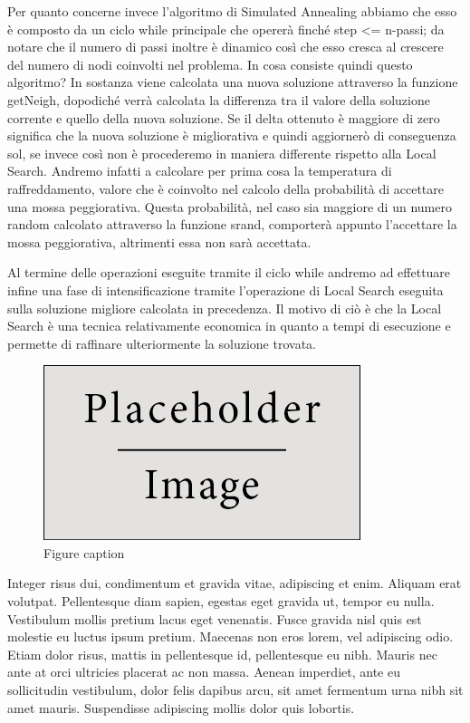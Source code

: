 \documentclass[preprint,12pt]{elsarticle}
\begin{document}
Per quanto concerne invece l'algoritmo di Simulated Annealing abbiamo che esso è composto da un ciclo while principale che opererà finché step <= n-passi; da notare che il numero di passi inoltre è dinamico così che esso cresca al crescere del numero di nodi coinvolti nel problema. In cosa consiste quindi questo algoritmo? In sostanza viene calcolata una nuova soluzione attraverso la funzione getNeigh, dopodiché verrà calcolata la differenza tra il valore della soluzione corrente e quello della nuova soluzione. Se il delta ottenuto è maggiore di zero significa che la nuova soluzione è migliorativa e quindi aggiornerò di conseguenza sol, se invece così non è procederemo in maniera differente rispetto alla Local Search. Andremo infatti a calcolare per prima cosa la temperatura di raffreddamento, valore che è coinvolto nel calcolo della probabilità di accettare una mossa peggiorativa. Questa probabilità, nel caso sia maggiore di un numero random calcolato attraverso la funzione srand, comporterà appunto l'accettare la mossa peggiorativa, altrimenti essa non sarà accettata.

Al termine delle operazioni eseguite tramite il ciclo while andremo ad effettuare infine una fase di intensificazione tramite l'operazione di Local Search eseguita sulla soluzione migliore calcolata in precedenza. Il motivo di ciò è che la Local Search è una tecnica relativamente economica in quanto a tempi di esecuzione e permette di raffinare ulteriormente la soluzione trovata.


\begin{figure}[h]
\centering\includegraphics[width=0.4\linewidth]{placeholder}
\caption{Figure caption}
\end{figure}

Integer risus dui, condimentum et gravida vitae, adipiscing et enim. Aliquam erat volutpat. Pellentesque diam sapien, egestas eget gravida ut, tempor eu nulla. Vestibulum mollis pretium lacus eget venenatis. Fusce gravida nisl quis est molestie eu luctus ipsum pretium. Maecenas non eros lorem, vel adipiscing odio. Etiam dolor risus, mattis in pellentesque id, pellentesque eu nibh. Mauris nec ante at orci ultricies placerat ac non massa. Aenean imperdiet, ante eu sollicitudin vestibulum, dolor felis dapibus arcu, sit amet fermentum urna nibh sit amet mauris. Suspendisse adipiscing mollis dolor quis lobortis.
\end{document}
